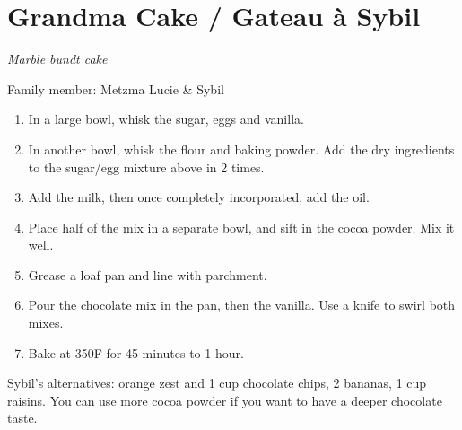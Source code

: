 \chapter{Grandma Cake / Gateau à Sybil}
\label{ch:grandma_cake}


\textit{Marble bundt cake}

Family member: Metzma Lucie \& Sybil

\begin{enumerate}
    \item In a large bowl, whisk the sugar, eggs and vanilla.
    \item In another bowl, whisk the flour and baking powder. Add the dry ingredients to the sugar/egg mixture above in 2 times.
    \item Add the milk, then once completely incorporated, add the oil.
    \item Place half of the mix in a separate bowl, and sift in the cocoa powder. Mix it well.
    \item Grease a loaf pan and line with parchment.
    \item Pour the chocolate mix in the pan, then the vanilla. Use a knife to swirl both mixes.
    \item Bake at 350\degree F for 45 minutes to 1 hour.
\end{enumerate}


Sybil's alternatives: orange zest and 1 cup chocolate chips, 2 bananas, 1 cup raisins. You can use more cocoa powder if you want to have a deeper chocolate taste.
